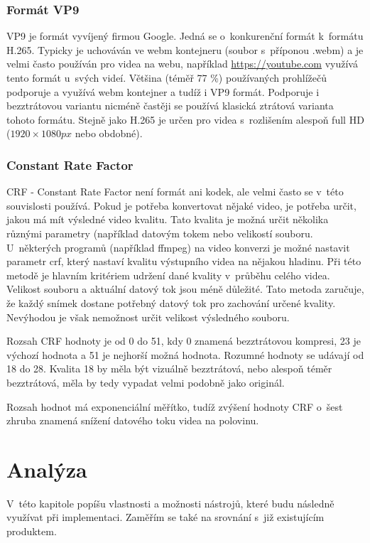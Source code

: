 \documentclass[thesis=M,czech]{FITthesis}[2016/06/26]
\begin{document}
\subsection{Formát VP9}
VP9 je formát vyvíjený firmou Google. Jedná se o~konkurenční formát k~formátu H.265. Typicky je uchováván ve webm kontejneru (soubor s~příponou .webm) a je velmi často používán pro videa na webu, například \url{https://youtube.com} využívá tento formát u~svých videí. Většina (téměř 77 \%) používaných prohlížečů podporuje a využívá webm kontejner a tudíž i VP9 formát. \cite{vp9_usage} Podporuje i bezztrátovou variantu nicméně častěji se používá klasická ztrátová varianta tohoto formátu. Stejně jako H.265 je určen pro videa s~rozlišením alespoň full HD ($1920 \times 1080px$ nebo obdobné).
\subsection{Constant Rate Factor} \label{crf}
CRF - Constant Rate Factor není formát ani kodek, ale velmi často se v~této souvislosti používá. Pokud je potřeba konvertovat nějaké video, je potřeba určit, jakou má mít výsledné video kvalitu. Tato kvalita je možná určit několika různými parametry (například datovým tokem nebo velikostí souboru. U~některých programů (například ffmpeg) na video konverzi je možné nastavit parametr crf, který nastaví kvalitu výstupního videa na nějakou hladinu. Při této metodě je hlavním kritériem udržení dané kvality v~průběhu celého videa. Velikost souboru a aktuální datový tok jsou méně důležité. Tato metoda zaručuje, že každý snímek dostane potřebný datový tok pro zachování určené kvality. Nevýhodou je však nemožnost určit velikost výsledného souboru.

Rozsah CRF hodnoty je od 0 do 51, kdy 0 znamená bezztrátovou kompresi, 23 je výchozí hodnota a 51 je nejhorší možná hodnota. Rozumné hodnoty se udávají od 18 do 28\cite{crf}. Kvalita 18 by měla být vizuálně bezztrátová, nebo alespoň téměr bezztrátová, měla by tedy vypadat velmi podobně jako originál.

Rozsah hodnot má exponenciální měřítko, tudíž zvýšení hodnoty CRF o~šest zhruba znamená snížení datového toku videa na polovinu.


\chapter{Analýza}
V~této kapitole popíšu vlastnosti a možnosti nástrojů, které budu následně využívat při implementaci. Zaměřím se také na srovnání s~již existujícím produktem.
\end{document}
